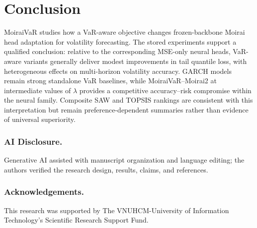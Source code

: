 \documentclass[runningheads]{llncs}
\begin{document}
\section{Conclusion}
MoiraiVaR studies how a VaR-aware objective changes frozen-backbone Moirai head adaptation for volatility forecasting. The stored experiments support a qualified conclusion: relative to the corresponding MSE-only neural heads, VaR-aware variants generally deliver modest improvements in tail quantile loss, with heterogeneous effects on multi-horizon volatility accuracy. GARCH models remain strong standalone VaR baselines, while MoiraiVaR--Moirai2 at intermediate values of $\lambda$ provides a competitive accuracy--risk compromise within the neural family. Composite SAW and TOPSIS rankings are consistent with this interpretation but remain preference-dependent summaries rather than evidence of universal superiority.

\subsubsection{AI Disclosure.} Generative AI assisted with manuscript organization and language editing; the authors verified the research design, results, claims, and references.

\subsubsection{Acknowledgements.}This research was supported by The VNUHCM-University of Information Technology's Scientific Research Support Fund.
\end{document}
